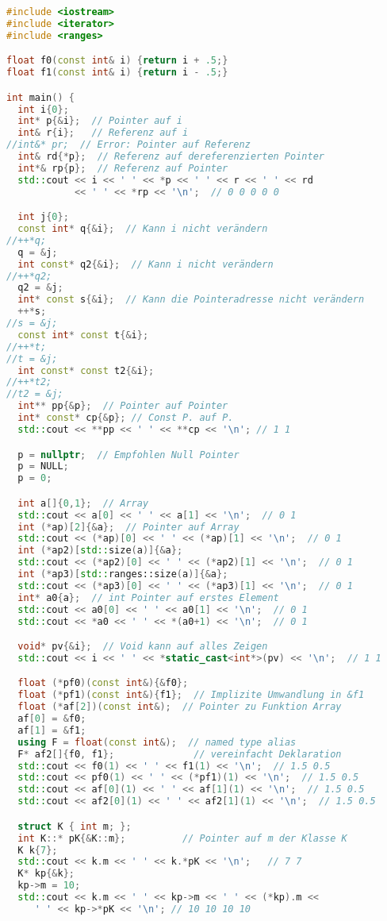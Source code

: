 \documentclass[10pt,twocolumn]{scrartcl}
\begin{document}
\begin{lstlisting}[language=C++]
#include <iostream>
#include <iterator>
#include <ranges>

float f0(const int& i) {return i + .5;}
float f1(const int& i) {return i - .5;}

int main() {
  int i{0};
  int* p{&i};  // Pointer auf i
  int& r{i};   // Referenz auf i
//int&* pr;  // Error: Pointer auf Referenz
  int& rd{*p};  // Referenz auf dereferenzierten Pointer
  int*& rp{p};  // Referenz auf Pointer
  std::cout << i << ' ' << *p << ' ' << r << ' ' << rd
            << ' ' << *rp << '\n';  // 0 0 0 0 0

  int j{0};
  const int* q{&i};  // Kann i nicht verändern
//++*q;
  q = &j;
  int const* q2{&i};  // Kann i nicht verändern
//++*q2;
  q2 = &j;
  int* const s{&i};  // Kann die Pointeradresse nicht verändern
  ++*s;
//s = &j;
  const int* const t{&i};
//++*t;
//t = &j;
  int const* const t2{&i};
//++*t2;
//t2 = &j;
  int** pp{&p};  // Pointer auf Pointer
  int* const* cp{&p}; // Const P. auf P.
  std::cout << **pp << ' ' << **cp << '\n'; // 1 1

  p = nullptr;  // Empfohlen Null Pointer
  p = NULL;
  p = 0;

  int a[]{0,1};  // Array
  std::cout << a[0] << ' ' << a[1] << '\n';  // 0 1
  int (*ap)[2]{&a};  // Pointer auf Array
  std::cout << (*ap)[0] << ' ' << (*ap)[1] << '\n';  // 0 1
  int (*ap2)[std::size(a)]{&a};
  std::cout << (*ap2)[0] << ' ' << (*ap2)[1] << '\n';  // 0 1
  int (*ap3)[std::ranges::size(a)]{&a};
  std::cout << (*ap3)[0] << ' ' << (*ap3)[1] << '\n';  // 0 1
  int* a0{a};  // int Pointer auf erstes Element
  std::cout << a0[0] << ' ' << a0[1] << '\n';  // 0 1
  std::cout << *a0 << ' ' << *(a0+1) << '\n';  // 0 1

  void* pv{&i};  // Void kann auf alles Zeigen
  std::cout << i << ' ' << *static_cast<int*>(pv) << '\n';  // 1 1

  float (*pf0)(const int&){&f0};
  float (*pf1)(const int&){f1};  // Implizite Umwandlung in &f1
  float (*af[2])(const int&);  // Pointer zu Funktion Array
  af[0] = &f0;
  af[1] = &f1;
  using F = float(const int&);  // named type alias
  F* af2[]{f0, f1};              // vereinfacht Deklaration
  std::cout << f0(1) << ' ' << f1(1) << '\n';  // 1.5 0.5
  std::cout << pf0(1) << ' ' << (*pf1)(1) << '\n';  // 1.5 0.5
  std::cout << af[0](1) << ' ' << af[1](1) << '\n';  // 1.5 0.5
  std::cout << af2[0](1) << ' ' << af2[1](1) << '\n';  // 1.5 0.5

  struct K { int m; };
  int K::* pK{&K::m};          // Pointer auf m der Klasse K
  K k{7};
  std::cout << k.m << ' ' << k.*pK << '\n';   // 7 7
  K* kp{&k};
  kp->m = 10;
  std::cout << k.m << ' ' << kp->m << ' ' << (*kp).m <<
     ' ' << kp->*pK << '\n'; // 10 10 10 10


\end{lstlisting}
\end{document}
